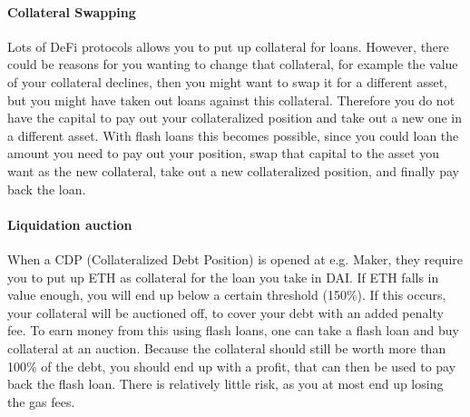 \paragraph{Collateral Swapping} Lots of DeFi protocols allows you to
put up collateral for loans. However, there could be reasons for you
wanting to change that collateral, for example the value of your collateral
declines, then you might want to swap it for a different asset, but you might
have taken out loans against this collateral. Therefore you do not have the
capital to pay out your collateralized position and take out a new one in a
different asset. With flash loans this becomes possible, since you could loan
the amount you need to pay out your position, swap that capital to the asset you
want as the new collateral, take out a new collateralized position, and finally
pay back the loan. 

\paragraph{Liquidation auction} When a CDP (Collateralized Debt Position) is
opened at e.g. Maker, they require you to put up ETH as collateral for the loan
you take in DAI. If ETH falls in value enough, you will end up below a certain
threshold (150\%). If this occurs, your collateral will be auctioned off, to
cover your debt with an added penalty fee. To earn money from this
using flash loans, one can take a flash loan and buy collateral at an auction.
Because the collateral should still be worth more than 100\% of the debt, you
should end up with a profit, that can then be used to pay back the flash loan.
There is relatively little risk, as you at most end up losing the gas fees.

